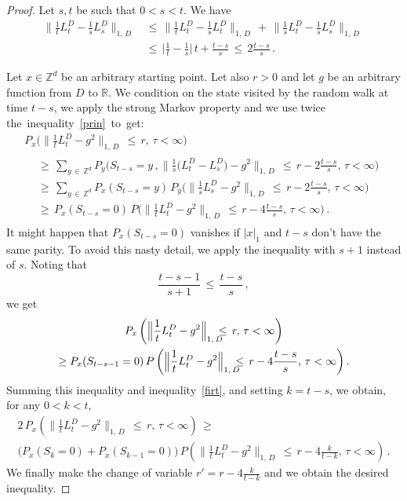 \documentclass[10pt]{amsart}
\theoremstyle{definition}\newtheorem{defi}[theo]{Definition}\newtheorem{rema}[theo]{Remark}\newtheorem{exam}[theo]{Example}\newtheorem{exem}[theo]{Example}\newtheorem{nota}[theo]{Notation}
\newcommand*\Zd {{\mathbb Z^d}}
\newcommand*\R{\mathbb{R}}
\begin{document}
\begin{proof}
Let $s,t$ be such that $0<s<t$. We have
\begin{equation}\label{prin}
\begin{aligned}
\Big\|\frac{1}{t}L_t^D-
\frac{1}{s}L_s^D\Big\|_{1,\,D}\,&\leq\,
\Big\|\frac{1}{t}L_t^D-
\frac{1}{s}L_t^D\Big\|_{1,\,D}\,+\,
\Big\|\frac{1}{s}L_t^D-
\frac{1}{s}L_s^D\Big\|_{1,\,D}\,\\
&\leq\,
\Big|\frac{1}{t} -\frac{1}{s}\Big|\,t+\frac{t-s}{s}\,\leq\, 2\frac{t-s}{s}
\,.
\end{aligned}
\end{equation}


Let $x\in\Zd$ be an arbitrary starting point. Let also $r>0$ and let $g$ be an arbitrary function from $D$ to $\R$. We condition on the state visited by the random walk at time $t-s$, we apply the strong Markov property and we use twice the~inequality~\eqref{prin}~to~get:
\begin{multline}\label{firt}
P_x\Big(
\Big\|\frac{1}{t}L_t^D-g^2
\Big\|_{1,\,D}
\,\leq\,r,\,\tau<\infty
\Big)
\\
\begin{aligned}
&\geq\,
\sum_{y\,\in\,\Zd} P_y\Big(S_{t-s}=y\,,
\Big\|
\frac{1}{s}\big(L_t^D- L_s^D\big)-g^2
\Big\|_{1,\,D}\,\leq\,r -2\frac{t-s}{s},\,\tau<\infty
\Big)\\
&\geq\,
\sum_{y\,\in\,\Zd} P_x(S_{t-s}=y)\, P_y\Big(
\Big\|\frac{1}{s}L_s^D-g^2
\Big\|_{1,\,D}\,\leq\,r -2\frac{t-s}{s},\,\tau<\infty
\Big)\\
&\geq\, P_x(S_{t-s}=0)\, P\Big(
\Big\|\frac{1}{t}L_t^D-g^2
\Big\|_{1,\,D}\,\leq\,r -4\frac{t-s}{s},\,\tau<\infty
\Big)\,.
\end{aligned}
\end{multline}
It might happen that $P_x(S_{t-s}=0)$ vanishes if $|x|_{1}$ and $t-s$ don't have the same parity. To avoid this nasty detail, we apply the inequality with $s+1$ instead of $s$. Noting that
\[
\frac{t-s-1}{s+1}\,\leq\,\frac{t-s}{s}\,,
\]
we get
\begin{multline*}
P_x\left(
\Big\|\frac{1}{t}L_t^D-g^2
\Big\|_{1,\,D}
\kern-7pt
\leq\,r,\,\tau<\infty
\right)\\
\geq P_x(S_{t-s-1}=0)\, P\left(
\Big\|\frac{1}{t}L_t^D-g^2
\Big\|_{1,\,D}
\kern-7pt
\leq\, r -4\frac{t-s}{s},\,\tau<\infty
\right).
\end{multline*}
Summing this inequality and inequality~\eqref{firt}, and setting $k=t-s$, we obtain, for any $0<k<t$,
\begin{multline*}
2\,P_x\left(
\Big\|\frac{1}{t}L_t^D-g^2
\Big\|_{1,\,D}\,\leq\,r,\,\tau<\infty
\right)
\,\geq\,\\
\big(P_x(S_{k}=0)+ P_x(S_{k-1}=0)\big)\, P\left(
\Big\|\frac{1}{t}L_t^D-g^2
\Big\|_{1,\,D}\,\leq\,r -4\frac{k}{t-k},\,\tau<\infty
\right)\,.
\end{multline*}
We finally make the change of variable $r'=r -4\frac{k}{t-k}$ and we obtain the desired inequality.
\end{proof}
\end{document}

